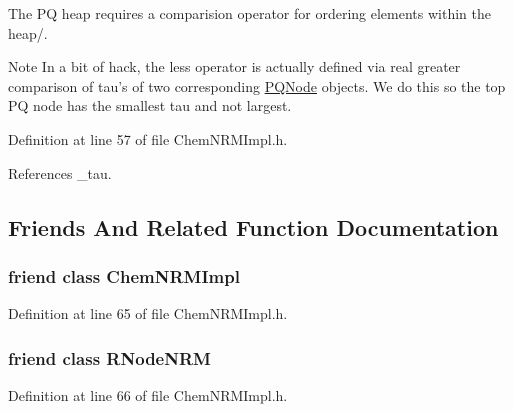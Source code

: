 The P\-Q heap requires a comparision operator for ordering elements within the heap/. 

\begin{DoxyNote}{Note}
In a bit of hack, the less operator is actually defined via real greater comparison of tau's of two corresponding \hyperlink{classchem_1_1PQNode}{P\-Q\-Node} objects. We do this so the top P\-Q node has the smallest tau and not largest. 
\end{DoxyNote}


Definition at line 57 of file Chem\-N\-R\-M\-Impl.\-h.



References \-\_\-tau.



\subsection{Friends And Related Function Documentation}
\hypertarget{classchem_1_1PQNode_a6dae39f8dddcdbda9b4f6a1c1bf1bda8}{
\subsubsection[{Chem\-N\-R\-M\-Impl}]{\setlength{\rightskip}{0pt plus 5cm}friend class {\bf Chem\-N\-R\-M\-Impl}}}\label{classchem_1_1PQNode_a6dae39f8dddcdbda9b4f6a1c1bf1bda8}


Definition at line 65 of file Chem\-N\-R\-M\-Impl.\-h.

\hypertarget{classchem_1_1PQNode_a9dfcd0d41325e8ca108cba1768ebab89}{
\subsubsection[{R\-Node\-N\-R\-M}]{\setlength{\rightskip}{0pt plus 5cm}friend class {\bf R\-Node\-N\-R\-M}}}\label{classchem_1_1PQNode_a9dfcd0d41325e8ca108cba1768ebab89}


Definition at line 66 of file Chem\-N\-R\-M\-Impl.\-h.



